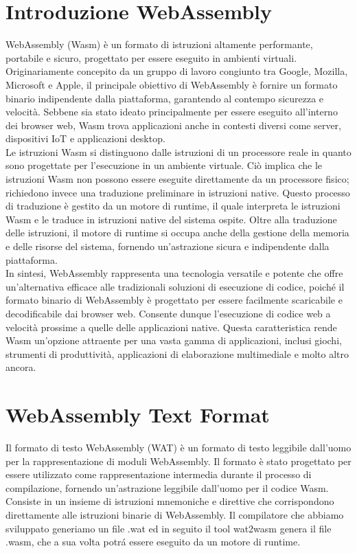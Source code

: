 \documentclass[../../main.tex]{subfiles}
\begin{document}
\section{Introduzione WebAssembly}
WebAssembly (Wasm) è un formato di istruzioni altamente performante, portabile e sicuro, progettato per essere eseguito in ambienti virtuali. Originariamente concepito da un gruppo di lavoro congiunto tra Google, Mozilla, Microsoft e Apple, il principale obiettivo di WebAssembly è fornire un formato binario indipendente dalla piattaforma, garantendo al contempo sicurezza e velocità. Sebbene sia stato ideato principalmente per essere eseguito all'interno dei browser web, Wasm trova applicazioni anche in contesti diversi come server, dispositivi IoT e applicazioni desktop.\\
Le istruzioni Wasm si distinguono dalle istruzioni di un processore reale in quanto sono progettate per l'esecuzione in un ambiente virtuale. Ciò implica che le istruzioni Wasm non possono essere eseguite direttamente da un processore fisico; richiedono invece una traduzione preliminare in istruzioni native. Questo processo di traduzione è gestito da un motore di runtime, il quale interpreta le istruzioni Wasm e le traduce in istruzioni native del sistema ospite. Oltre alla traduzione delle istruzioni, il motore di runtime si occupa anche della gestione della memoria e delle risorse del sistema, fornendo un'astrazione sicura e indipendente dalla piattaforma.\\
In sintesi, WebAssembly rappresenta una tecnologia versatile e potente che offre un'alternativa efficace alle tradizionali soluzioni di esecuzione di codice, poiché il formato binario di WebAssembly è progettato per essere facilmente scaricabile e decodificabile dai browser web. Consente dunque l'esecuzione di codice web a velocità prossime a quelle delle applicazioni native. Questa caratteristica rende Wasm un'opzione attraente per una vasta gamma di applicazioni, inclusi giochi, strumenti di produttività, applicazioni di elaborazione multimediale e molto altro ancora.\autocite{WebAssemblyDoc}

\section{WebAssembly Text Format}
\label{wat}
Il formato di testo WebAssembly (WAT) \autocite{WebAssemblyTextFormat} è un formato di testo leggibile dall'uomo per la rappresentazione di moduli WebAssembly. Il formato è stato progettato per essere utilizzato come rappresentazione intermedia durante il processo di compilazione, fornendo un'astrazione leggibile dall'uomo per il codice Wasm.
Consiste in un insieme di istruzioni mnemoniche e direttive che corrispondono direttamente alle istruzioni binarie di WebAssembly.
Il compilatore che abbiamo sviluppato generiamo un file .wat ed in seguito il tool wat2wasm \autocite{jain2022webassembly} genera il file .wasm, che a sua volta potrá essere eseguito da un motore di runtime.
\end{document}
